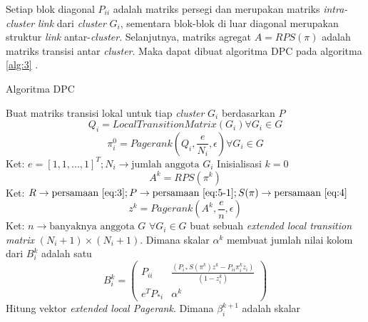 Setiap blok diagonal $P_{ii}$ adalah matriks persegi dan merupakan matriks \textit{intra-cluster} \textit{link} dari \textit{cluster} $G_i$, sementara blok-blok di luar diagonal merupakan struktur \textit{link} antar-\textit{cluster}. Selanjutnya, matriks agregat $A = RPS(\pi)$ adalah matriks transisi antar \textit{cluster}. Maka dapat dibuat algoritma DPC pada algoritma \ref{alg:3} \citep{zhuetal2005distributedPagerank}.

\begin{breakablealgorithm}
\label{alg:3}
\caption{Algoritma DPC \citep{zhuetal2005distributedPagerank}}
\begin{algorithmic}[1]
  \State Buat matriks transisi lokal untuk tiap \textit{cluster} $G_i$ berdasarkan $P$ 
		\begin{equation} \label{alg:3.step:trivial:1} Q_i = LocalTransitionMatrix(G_i) \forall G_i \in G \end{equation}
  \State 
		\begin{equation} \label{alg:3.step:trivial:2} \pi_i^0 = Pagerank(Q_i, \frac{e}{N_i}, \epsilon) \forall G_i \in G \end{equation}
		Ket: $e = [1, 1, ..., 1]^T; N_i \rightarrow \text{jumlah anggota $G_i$}$
  \State Inisialisasi $k = 0$
	\State
		\begin{equation} \label{alg:3.step:2:1} A^k = RPS(\pi^k) \end{equation}
		Ket: $R \rightarrow \text{persamaan \ref{eq:3}}; P \rightarrow \text{persamaan \ref{eq:5-1}}; S(\pi) \rightarrow \text{persamaan \ref{eq:4}}$
	\State
		\begin{equation} \label{alg:3.step:2:2} z^k = Pagerank(A^k, \frac{e}{n}, \epsilon) \end{equation}
		Ket: $n \rightarrow \text{banyaknya anggota }G$
	\State \label{alg:3.step:3:1} $\forall G_i \in G$ buat sebuah \textit{extended local transition matrix} $(N_i + 1) \times (N_i + 1)$. Dimana skalar $\alpha^k$ membuat jumlah nilai kolom dari $B^k_i$ adalah satu
		\begin{equation}
			\label{eq:9}
			B_i^k =
			\begin{pmatrix}
				P_{ii} 		& \frac{(P_{i*}S(\pi^k)z^k - P_{ii}\pi_i^kz_i)}{(1 - z^k_i)} \\
				e^TP_{*i} & \alpha^k
			\end{pmatrix}
		\end{equation}
	\State \label{alg:3.step:3:2} Hitung vektor \textit{extended local Pagerank}. Dimana $\beta^{k+1}_i$ adalah skalar
		\begin{equation}

\end{equation}
\end{algorithmic}
\end{breakablealgorithm}
